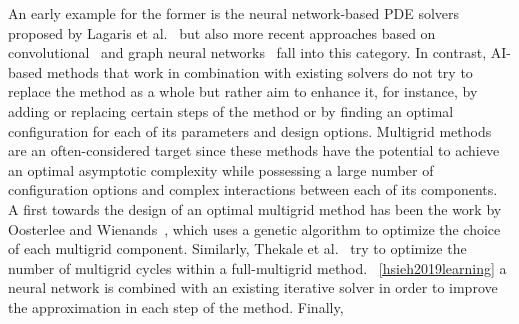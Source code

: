 An early example for the former is the neural network-based PDE solvers proposed by Lagaris et al.~\cite{lagaris1998artificial} but also more recent approaches based on convolutional~\cite{thuerey2020deep} and graph neural networks~\cite{pfaff2020learning} fall into this category.
In contrast, AI-based methods that work in combination with existing solvers do not try to replace the method as a whole but rather aim to enhance it, for instance, by adding or replacing certain steps of the method or by finding an optimal configuration for each of its parameters and design options.
Multigrid methods are an often-considered target since these methods have the potential to achieve an optimal asymptotic complexity while possessing a large number of configuration options and complex interactions between each of its components.
A first towards the design of an optimal multigrid method has been the work by Oosterlee and Wienands~\cite{oosterlee2003genetic}, which uses a genetic algorithm to optimize the choice of each multigrid component.
Similarly, Thekale et al.~\cite{thekale2010optimizing} try to optimize the number of multigrid cycles within a full-multigrid method.
~\ref{hsieh2019learning} a neural network is combined with an existing iterative solver in order to improve the approximation in each step of the method.
Finally, 
 
